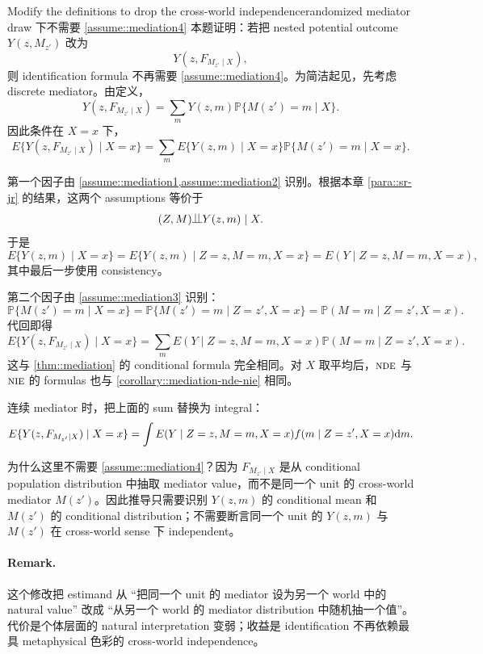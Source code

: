 \begin{exercisesolution}{Modify the definitions to drop the cross-world independence}{randomized mediator draw 下不需要 \cref{assume::mediation4}}
本题证明：若把 nested potential outcome $Y(z,M_{z'})$ 改为
\[
Y(z,F_{M_{z'}\mid X}),
\]
则 identification formula 不再需要 \cref{assume::mediation4}。为简洁起见，先考虑 discrete mediator。由定义，
\[
Y(z,F_{M_{z'}\mid X})
=
\sum_m Y(z,m)\mathbb{P}\{M(z')=m\mid X\}.
\]
因此条件在 $X=x$ 下，
\[
E\{Y(z,F_{M_{z'}\mid X})\mid X=x\}
=
\sum_m E\{Y(z,m)\mid X=x\}\mathbb{P}\{M(z')=m\mid X=x\}.
\]

第一个因子由 \cref{assume::mediation1,assume::mediation2} 识别。根据本章 \cref{para::sr-jr} 的结果，这两个 assumptions 等价于
\[
(Z,M)\ind Y(z,m)\mid X.
\]
于是
\[
E\{Y(z,m)\mid X=x\}
=
E\{Y(z,m)\mid Z=z,M=m,X=x\}
=
E(Y\mid Z=z,M=m,X=x),
\]
其中最后一步使用 consistency。

第二个因子由 \cref{assume::mediation3} 识别：
\[
\mathbb{P}\{M(z')=m\mid X=x\}
=
\mathbb{P}\{M(z')=m\mid Z=z',X=x\}
=
\mathbb{P}(M=m\mid Z=z',X=x).
\]
代回即得
\[
E\{Y(z,F_{M_{z'}\mid X})\mid X=x\}
=
\sum_m E(Y\mid Z=z,M=m,X=x)
\mathbb{P}(M=m\mid Z=z',X=x).
\]
这与 \cref{thm::mediation} 的 conditional formula 完全相同。对 $X$ 取平均后，$\textsc{nde}$ 与 $\textsc{nie}$ 的 formulas 也与 \cref{corollary::mediation-nde-nie} 相同。

连续 mediator 时，把上面的 sum 替换为 integral：
\[
E\{Y(z,F_{M_{z'}\mid X})\mid X=x\}
=
\int E(Y\mid Z=z,M=m,X=x)f(m\mid Z=z',X=x)\textnormal{d} m.
\]

为什么这里不需要 \cref{assume::mediation4}？因为 $F_{M_{z'}\mid X}$ 是从 conditional population distribution 中抽取 mediator value，而不是同一个 unit 的 cross-world mediator $M(z')$。因此推导只需要识别 $Y(z,m)$ 的 conditional mean 和 $M(z')$ 的 conditional distribution；不需要断言同一个 unit 的 $Y(z,m)$ 与 $M(z')$ 在 cross-world sense 下 independent。

\paragraph{Remark.}
这个修改把 estimand 从 ``把同一个 unit 的 mediator 设为另一个 world 中的 natural value'' 改成 ``从另一个 world 的 mediator distribution 中随机抽一个值''。代价是个体层面的 natural interpretation 变弱；收益是 identification 不再依赖最具 metaphysical 色彩的 cross-world independence。
\end{exercisesolution}
